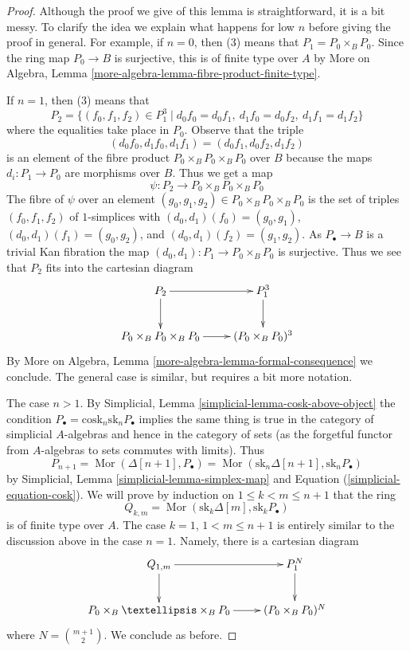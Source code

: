 \documentclass{stacks-project}
\theoremstyle{plain}
\theoremstyle{definition}
\theoremstyle{remark}
\numberwithin{equation}{subsection}
\def\Mor{\mathop{\mathrm{Mor}}\nolimits}
\begin{document}
\begin{proof}
Although the proof we give of this lemma is straightforward, it is a bit
messy. To clarify the idea we explain what happens for low $n$ before giving
the proof in general. For example, if $n = 0$, then (3) means that
$P_1 = P_0 \times_B P_0$. Since the ring map $P_0 \to B$ is surjective, this
is of finite type over $A$ by
More on Algebra, Lemma \ref{more-algebra-lemma-fibre-product-finite-type}.

\medskip\noindent
If $n = 1$, then (3) means that
$$
P_2 = \{(f_0, f_1, f_2) \in P_1^3 \mid
d_0f_0 = d_0f_1,\ d_1f_0 = d_0f_2,\ d_1f_1 = d_1f_2 \}
$$
where the equalities take place in $P_0$. Observe that the triple
$$
(d_0f_0, d_1f_0, d_1f_1) = (d_0f_1, d_0f_2, d_1f_2)
$$
is an element of the fibre product $P_0 \times_B P_0 \times_B P_0$ over $B$
because the maps $d_i : P_1 \to P_0$ are morphisms over $B$. Thus we get
a map
$$
\psi : P_2 \longrightarrow P_0 \times_B P_0 \times_B P_0
$$
The fibre of $\psi$ over an element
$(g_0, g_1, g_2) \in P_0 \times_B P_0 \times_B P_0$
is the set of triples $(f_0, f_1, f_2)$ of $1$-simplices
with $(d_0, d_1)(f_0) = (g_0, g_1)$, $(d_0, d_1)(f_1) = (g_0, g_2)$,
and $(d_0, d_1)(f_2) = (g_1, g_2)$. As $P_\bullet \to B$ is a trivial
Kan fibration the map $(d_0, d_1) : P_1 \to P_0 \times_B P_0$ is
surjective. Thus we see that $P_2$ fits into the cartesian diagram
$$
\xymatrix{
P_2 \ar[d] \ar[r] & P_1^3 \ar[d] \\
P_0 \times_B P_0 \times_B P_0 \ar[r] & (P_0 \times_B P_0)^3
}
$$
By More on Algebra, Lemma \ref{more-algebra-lemma-formal-consequence}
we conclude. The general case is similar, but requires a bit more notation.

\medskip\noindent
The case $n > 1$. By Simplicial, Lemma \ref{simplicial-lemma-cosk-above-object}
the condition $P_\bullet = \text{cosk}_n \text{sk}_n P_\bullet$
implies the same thing is true in the category of simplicial
$A$-algebras and hence in the category of sets (as the forgetful
functor from $A$-algebras to sets commutes with limits). Thus
$$
P_{n + 1} =
\Mor(\Delta[n + 1], P_\bullet) =
\Mor(\text{sk}_n \Delta[n + 1], \text{sk}_n P_\bullet)
$$
by Simplicial, Lemma \ref{simplicial-lemma-simplex-map} and
Equation (\ref{simplicial-equation-cosk}). We will prove by induction
on $1 \leq k < m \leq n + 1$ that the ring
$$
Q_{k, m} = \Mor(\text{sk}_k \Delta[m], \text{sk}_k P_\bullet)
$$
is of finite type over $A$. The case $k = 1$, $1 < m \leq n + 1$
is entirely similar to the discussion above in the case $n = 1$.
Namely, there is a cartesian diagram
$$
\xymatrix{
Q_{1, m} \ar[d] \ar[r] & P_1^N \ar[d] \\
P_0 \times_B \ldots \times_B P_0 \ar[r] & (P_0 \times_B P_0)^N
}
$$
where $N = {m + 1 \choose 2}$. We conclude as before.


\end{proof}
\end{document}
